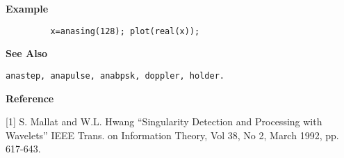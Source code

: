{\bf \large {}\selectfont Example}
\begin{verbatim}
         x=anasing(128); plot(real(x));
\end{verbatim}
\vspace*{.5cm}


{\bf \large {}\selectfont See Also}\\
\hspace*{1.5cm}
\begin{minipage}[t]{13.5cm}
\begin{verbatim}
anastep, anapulse, anabpsk, doppler, holder.
\end{verbatim}
\end{minipage}
\vspace*{.5cm}


{\bf \large {}\selectfont Reference}\\
\hspace*{1.5cm}
\begin{minipage}[t]{13.5cm}
[1] S. Mallat and W.L. Hwang ``Singularity Detection and Processing with
Wavelets'' IEEE Trans. on Information Theory, Vol 38, No 2, March 1992,
pp. 617-643.
\end{minipage}


